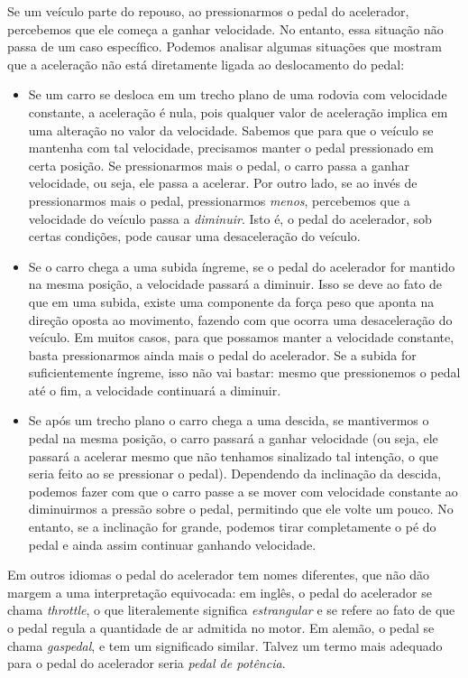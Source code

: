 Se um veículo parte do repouso, ao pressionarmos o pedal do acelerador, percebemos que ele começa a ganhar velocidade. No entanto, essa situação não passa de um caso específico. Podemos analisar algumas situações que mostram que a aceleração não está diretamente ligada ao deslocamento do pedal:
\begin{itemize}
	\item Se um carro se desloca em um trecho plano de uma rodovia com velocidade constante, a aceleração é nula, pois qualquer valor de aceleração implica em uma alteração no valor da velocidade. Sabemos que para que o veículo se mantenha com tal velocidade, precisamos manter o pedal pressionado em certa posição. Se pressionarmos mais o pedal, o carro passa a ganhar velocidade, ou seja, ele passa a acelerar. Por outro lado, se ao invés de pressionarmos mais o pedal, pressionarmos \emph{menos}, percebemos que a velocidade do veículo passa a \emph{diminuir}. Isto é, o pedal do acelerador, sob certas condições, pode causar uma desaceleração do veículo.
	\item Se o carro chega a uma subida íngreme, se o pedal do acelerador for mantido na mesma posição, a velocidade passará a diminuir. Isso se deve ao fato de que em uma subida, existe uma componente da força peso que aponta na direção oposta ao movimento, fazendo com que ocorra uma desaceleração do veículo. Em muitos casos, para que possamos manter a velocidade constante, basta pressionarmos ainda mais o pedal do acelerador. Se a subida for suficientemente íngreme, isso não vai bastar: mesmo que pressionemos o pedal até o fim, a velocidade continuará a diminuir.
	\item Se após um trecho plano o carro chega a uma descida, se mantivermos o pedal na mesma posição, o carro passará a ganhar velocidade (ou seja, ele passará a acelerar mesmo que não tenhamos sinalizado tal intenção, o que seria feito ao se pressionar o pedal). Dependendo da inclinação da descida, podemos fazer com que o carro passe a se mover com velocidade constante ao diminuirmos a pressão sobre o pedal, permitindo que ele volte um pouco. No entanto, se a inclinação for grande, podemos tirar completamente o pé do pedal e ainda assim continuar ganhando velocidade.
\end{itemize}

Em outros idiomas o pedal do acelerador tem nomes diferentes, que não dão margem a uma interpretação equivocada: em inglês, o pedal do acelerador se chama \emph{throttle}, o que literalemente significa \emph{estrangular} e se refere ao fato de que o pedal regula a quantidade de ar admitida no motor. Em alemão, o pedal se chama \emph{gaspedal}, e tem um significado similar. Talvez um termo mais adequado para o pedal do acelerador seria \emph{pedal de potência}.

